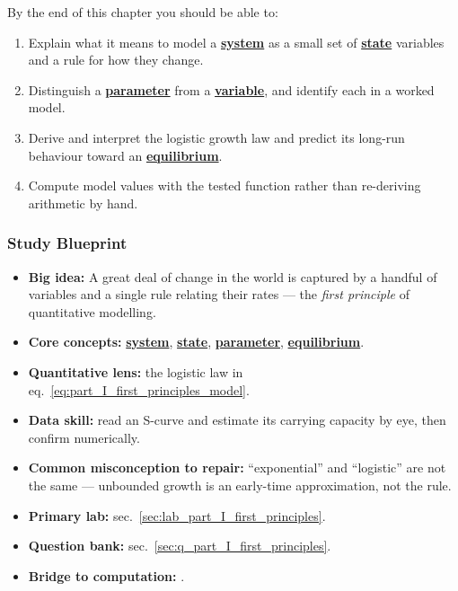 \documentclass[
]{article}
\providecommand{\tightlist}{%
  \setlength{\itemsep}{0pt}\setlength{\parskip}{0pt}}
\theoremstyle{plain}
\theoremstyle{definition}
\begin{document}
By the end of this chapter you should be able to:

\begin{enumerate}
\def\labelenumi{\arabic{enumi}.}
\tightlist
\item
  Explain what it means to model a \hyperref[gl:system]{\textbf{system}}
  as a small set of \hyperref[gl:state]{\textbf{state}} variables and a
  rule for how they change.
\item
  Distinguish a \hyperref[gl:parameter]{\textbf{parameter}} from a
  \hyperref[gl:variable]{\textbf{variable}}, and identify each in a
  worked model.
\item
  Derive and interpret the logistic growth law and predict its long-run
  behaviour toward an \hyperref[gl:equilibrium]{\textbf{equilibrium}}.
\item
  Compute model values with the tested function
   rather than re-deriving
  arithmetic by hand.
\end{enumerate}

\subsubsection{Study Blueprint}\label{study-blueprint-3}

\begin{itemize}
\tightlist
\item
  \textbf{Big idea:} A great deal of change in the world is captured by
  a handful of variables and a single rule relating their rates --- the
  \emph{first principle} of quantitative modelling.
\item
  \textbf{Core concepts:} \hyperref[gl:system]{\textbf{system}},
  \hyperref[gl:state]{\textbf{state}},
  \hyperref[gl:parameter]{\textbf{parameter}},
  \hyperref[gl:equilibrium]{\textbf{equilibrium}}.
\item
  \textbf{Quantitative lens:} the logistic law in
  eq.~\ref{eq:part_I_first_principles_model}.
\item
  \textbf{Data skill:} read an S-curve and estimate its carrying
  capacity by eye, then confirm numerically.
\item
  \textbf{Common misconception to repair:} ``exponential'' and
  ``logistic'' are not the same --- unbounded growth is an early-time
  approximation, not the rule.
\item
  \textbf{Primary lab:} sec.~\ref{sec:lab_part_I_first_principles}.
\item
  \textbf{Question bank:} sec.~\ref{sec:q_part_I_first_principles}.
\item
  \textbf{Bridge to computation:}
  .
\end{itemize}
\end{document}
